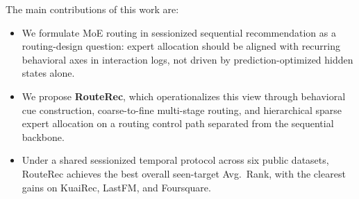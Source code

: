 \documentclass[sigconf,review,anonymous]{acmart}
\begin{document}
The main contributions of this work are:
\begin{itemize}
  \item We formulate MoE routing in sessionized sequential recommendation as a routing-design question: expert allocation should be aligned with recurring behavioral axes in interaction logs, not driven by prediction-optimized hidden states alone.
  \item We propose \textbf{RouteRec}, which operationalizes this view through behavioral cue construction, coarse-to-fine multi-stage routing, and hierarchical sparse expert allocation on a routing control path separated from the sequential backbone.
  \item Under a shared sessionized temporal protocol across six public datasets, RouteRec achieves the best overall seen-target Avg.~Rank, with the clearest gains on KuaiRec, LastFM, and Foursquare.
\end{itemize}

\end{document}
